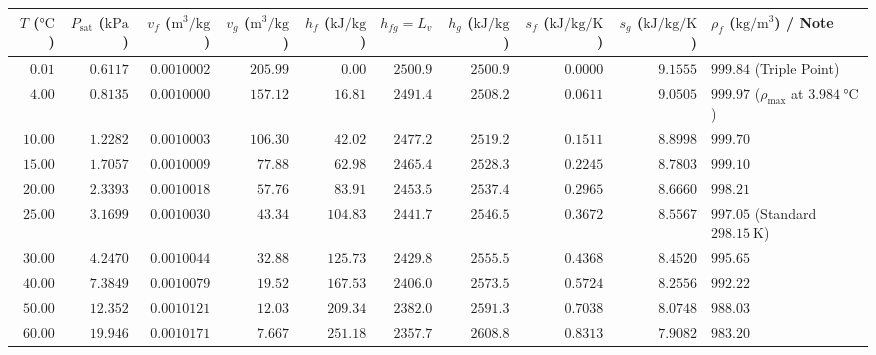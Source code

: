 \begin{center}
\label{tab:05:steamtables}
\scriptsize\setlength{\tabcolsep}{3.5pt}\renewcommand{\arraystretch}{1.08}
\begin{tabularx}{\linewidth}{@{}r r r r r r r r r X@{}}\toprule
\textbf{$T$ ($\si{\celsius}$)} & \textbf{$P_{\mathrm{sat}}$ ($\si{\kilo\pascal}$)} & \textbf{$v_f$ ($\si{\cubic\meter\per\kilogram}$)} & \textbf{$v_g$ ($\si{\cubic\meter\per\kilogram}$)} & \textbf{$h_f$ ($\si{\kilo\joule\per\kilogram}$)} & \textbf{$h_{fg} = L_v$} & \textbf{$h_g$ ($\si{\kilo\joule\per\kilogram}$)} & \textbf{$s_f$ ($\si{\kilo\joule\per\kilogram\per\kelvin}$)} & \textbf{$s_g$ ($\si{\kilo\joule\per\kilogram\per\kelvin}$)} & \textbf{$\rho_f$ ($\si{\kilogram\per\cubic\meter}$) / Note} \\\midrule
$0.01$ & $0.6117$ & $0.0010002$ & $205.99$ & $0.00$ & $2500.9$ & $2500.9$ & $0.0000$ & $9.1555$ & $999.84$ (Triple Point) \\
$4.00$ & $0.8135$ & $0.0010000$ & $157.12$ & $16.81$ & $2491.4$ & $2508.2$ & $0.0611$ & $9.0505$ & $999.97$ ($\rho_{\max}$ at $\SI{3.984}{\celsius}$) \\
$10.00$ & $1.2282$ & $0.0010003$ & $106.30$ & $42.02$ & $2477.2$ & $2519.2$ & $0.1511$ & $8.8998$ & $999.70$ \\
$15.00$ & $1.7057$ & $0.0010009$ & $77.88$ & $62.98$ & $2465.4$ & $2528.3$ & $0.2245$ & $8.7803$ & $999.10$ \\
$20.00$ & $2.3393$ & $0.0010018$ & $57.76$ & $83.91$ & $2453.5$ & $2537.4$ & $0.2965$ & $8.6660$ & $998.21$ \\
$25.00$ & $3.1699$ & $0.0010030$ & $43.34$ & $104.83$ & $2441.7$ & $2546.5$ & $0.3672$ & $8.5567$ & $997.05$ (Standard $\SI{298.15}{\kelvin}$) \\
$30.00$ & $4.2470$ & $0.0010044$ & $32.88$ & $125.73$ & $2429.8$ & $2555.5$ & $0.4368$ & $8.4520$ & $995.65$ \\
$40.00$ & $7.3849$ & $0.0010079$ & $19.52$ & $167.53$ & $2406.0$ & $2573.5$ & $0.5724$ & $8.2556$ & $992.22$ \\
$50.00$ & $12.352$ & $0.0010121$ & $12.03$ & $209.34$ & $2382.0$ & $2591.3$ & $0.7038$ & $8.0748$ & $988.03$ \\
$60.00$ & $19.946$ & $0.0010171$ & $7.667$ & $251.18$ & $2357.7$ & $2608.8$ & $0.8313$ & $7.9082$ & $983.20$ \\

\end{tabularx}
\end{center}
